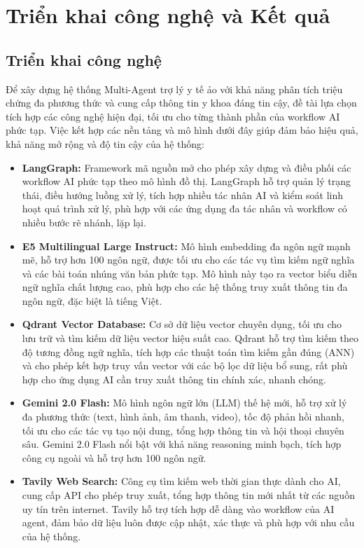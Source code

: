 \chapter{Triển khai công nghệ và Kết quả}

\section{Triển khai công nghệ}

Để xây dựng hệ thống Multi-Agent trợ lý y tế ảo với khả năng phân tích triệu chứng đa phương thức và cung cấp thông tin y khoa đáng tin cậy, đề tài lựa chọn tích hợp các công nghệ hiện đại, tối ưu cho từng thành phần của workflow AI phức tạp. Việc kết hợp các nền tảng và mô hình dưới đây giúp đảm bảo hiệu quả, khả năng mở rộng và độ tin cậy của hệ thống:

\begin{itemize}
    \item \textbf{LangGraph:} Framework mã nguồn mở cho phép xây dựng và điều phối các workflow AI phức tạp theo mô hình đồ thị. LangGraph hỗ trợ quản lý trạng thái, điều hướng luồng xử lý, tích hợp nhiều tác nhân AI và kiểm soát linh hoạt quá trình xử lý, phù hợp với các ứng dụng đa tác nhân và workflow có nhiều bước rẽ nhánh, lặp lại.
    
    \item \textbf{E5 Multilingual Large Instruct:} Mô hình embedding đa ngôn ngữ mạnh mẽ, hỗ trợ hơn 100 ngôn ngữ, được tối ưu cho các tác vụ tìm kiếm ngữ nghĩa và các bài toán nhúng văn bản phức tạp. Mô hình này tạo ra vector biểu diễn ngữ nghĩa chất lượng cao, phù hợp cho các hệ thống truy xuất thông tin đa ngôn ngữ, đặc biệt là tiếng Việt.
    
    \item \textbf{Qdrant Vector Database:} Cơ sở dữ liệu vector chuyên dụng, tối ưu cho lưu trữ và tìm kiếm dữ liệu vector hiệu suất cao. Qdrant hỗ trợ tìm kiếm theo độ tương đồng ngữ nghĩa, tích hợp các thuật toán tìm kiếm gần đúng (ANN) và cho phép kết hợp truy vấn vector với các bộ lọc dữ liệu bổ sung, rất phù hợp cho ứng dụng AI cần truy xuất thông tin chính xác, nhanh chóng.
    
    \item \textbf{Gemini 2.0 Flash:} Mô hình ngôn ngữ lớn (LLM) thế hệ mới, hỗ trợ xử lý đa phương thức (text, hình ảnh, âm thanh, video), tốc độ phản hồi nhanh, tối ưu cho các tác vụ tạo nội dung, tổng hợp thông tin và hội thoại chuyên sâu. Gemini 2.0 Flash nổi bật với khả năng reasoning minh bạch, tích hợp công cụ ngoài và hỗ trợ hơn 100 ngôn ngữ.
    
    \item \textbf{Tavily Web Search:} Công cụ tìm kiếm web thời gian thực dành cho AI, cung cấp API cho phép truy xuất, tổng hợp thông tin mới nhất từ các nguồn uy tín trên internet. Tavily hỗ trợ tích hợp dễ dàng vào workflow của AI agent, đảm bảo dữ liệu luôn được cập nhật, xác thực và phù hợp với nhu cầu của hệ thống.
\end{itemize}

